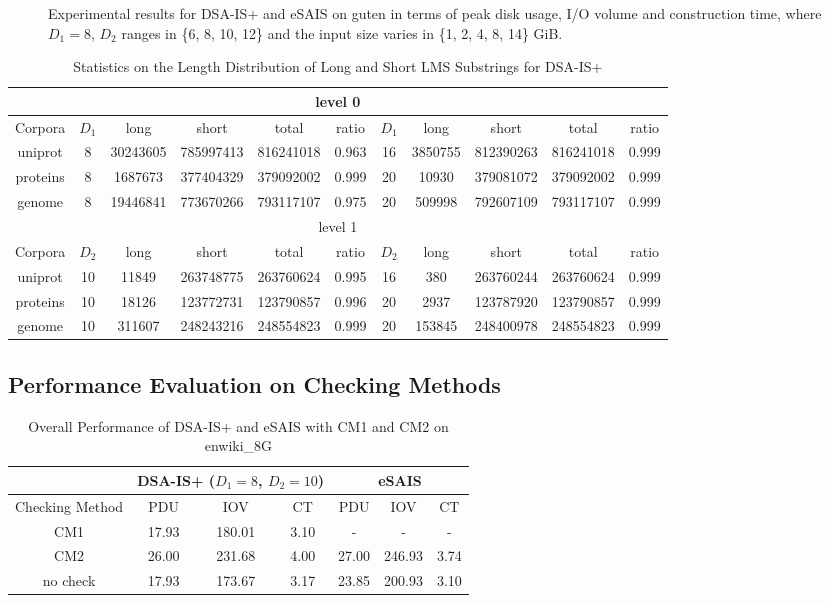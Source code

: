 \documentclass[10pt,journal,compsoc]{IEEEtran}
\begin{document}
\begin{figure}[htbp]
{		\label{subfig:ct_cmp3}
	}
	\caption{Experimental results for DSA-IS+ and eSAIS on guten in terms of peak disk usage, I/O volume and construction time, where $D_1 = 8$, $D_2$ ranges in \{6, 8, 10, 12\} and the input size varies in \{1, 2, 4, 8, 14\} GiB. }
	\label{fig:performance_analysis3}
\end{figure}


\begin{table}[htbp]
\caption{Statistics on the Length Distribution of Long and Short LMS Substrings for DSA-IS+}
\label{tbl:long_short_distribution}	
\centering
\begin{tabular}{|c|c|c|c|c|c|c|c|c|c|c|}
	\hline
	\multicolumn{11}{|c|}{level 0} \\\hline
	Corpora & $D_1$ & long & short & total & ratio & $D_1$ & long & short & total & ratio\\\hline
	uniprot & 8 & 30243605 & 785997413 & 816241018 & 0.963 & 16 & 3850755 & 812390263 & 816241018 & 0.999\\\hline
	proteins & 8 & 1687673 & 377404329 & 379092002 & 0.999 & 20 & 10930 & 379081072 & 379092002 & 0.999\\\hline
	genome & 8 & 19446841 & 773670266 & 793117107 & 0.975 & 20 & 509998 & 792607109 & 793117107 & 0.999\\\hline
	\multicolumn{11}{|c|}{level 1}\\\hline
	Corpora & $D_2$ & long & short & total & ratio & $D_2$ & long & short & total & ratio\\\hline
	uniprot & 10 & 11849 & 263748775 & 263760624 & 0.995 & 16 & 380 & 263760244 & 263760624 & 0.999\\\hline
	proteins & 10 & 18126 & 123772731 & 123790857 & 0.996 & 20 & 2937 & 123787920 & 123790857 & 0.999\\\hline
	genome & 10 & 311607 & 248243216 & 248554823 & 0.999 & 20 & 153845 & 248400978 & 248554823 & 0.999\\\hline
\end{tabular}
\end{table}%


\subsection{Performance Evaluation on Checking Methods}

\begin{table}[htbp]
	\caption{Overall Performance of DSA-IS+ and eSAIS with CM1 and CM2 on enwiki\_8G}
	\label{tbl:check_overhead}
	\centering
	\begin{tabular}{|c|c|c|c|c|c|c|}
		\hline
		& \multicolumn{3}{|c|}{DSA-IS+ ($D_1 = 8$, $D_2 = 10$)} & \multicolumn{3}{c|}{eSAIS}\\\hline
		Checking Method & PDU & IOV & CT & PDU & IOV & CT \\\hline
		CM1 & 17.93  & 180.01 & 3.10 & - & - & - \\\hline
		CM2 & 26.00 & 231.68 & 4.00 & 27.00 & 246.93 & 3.74 \\\hline
		no check & 17.93  & 173.67	& 3.17 & 23.85 & 200.93 & 3.10 \\\hline
	\end{tabular}
\end{table}%
\end{document}
